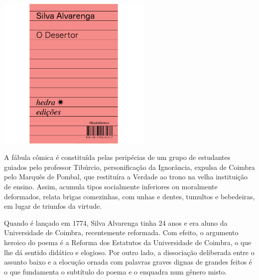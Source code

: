 \pagebreak

\begin{center}
\hspace*{.5cm}\includegraphics[width=74mm]{./grid/desertor.jpg}
\end{center}

\hspace*{-7cm}\hrulefill\hspace*{-7cm}

\medskip

\noindent{}A fábula cômica é constituída pelas peripécias de um grupo de estudantes guiados pelo professor Tibúrcio, personificação da Ignorância, expulsa de Coimbra pelo Marquês de Pombal, que restituíra a Verdade ao trono na velha instituição de ensino.  Assim, acumula tipos socialmente inferiores ou moralmente deformados, relata brigas comezinhas, com unhas e dentes, tumultos e bebedeiras, em lugar de triunfos da virtude.

Quando {} é lançado em 1774, Silva Alvarenga tinha 24 anos e era aluno da Universidade de Coimbra, recentemente reformada. Com efeito, o argumento heroico do poema é a Reforma dos Estatutos da Universidade de Coimbra, o que lhe dá sentido didático e elogioso. Por outro lado, a dissociação deliberada entre o assunto baixo e a elocução ornada com palavras graves dignas de grandes feitos é o que fundamenta o subtítulo do poema e o enquadra num gênero misto.

\vfill

\hspace*{-.4cm}\begin{minipage}[c]{.5\linewidth}
\small{
{}}
\end{minipage}

